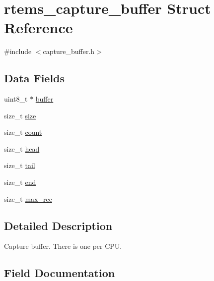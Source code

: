 \hypertarget{structrtems__capture__buffer}{}\section{rtems\+\_\+capture\+\_\+buffer Struct Reference}
\label{structrtems__capture__buffer}


{\ttfamily \#include $<$capture\+\_\+buffer.\+h$>$}

\subsection*{Data Fields}
\begin{DoxyCompactItemize}
\item 
uint8\+\_\+t $\ast$ \mbox{\hyperlink{structrtems__capture__buffer_adf23ae9c665882a5c9d80fe1e76b3e57}{buffer}}
\item 
size\+\_\+t \mbox{\hyperlink{structrtems__capture__buffer_ada65e25ece7917227c92f82d63dae799}{size}}
\item 
size\+\_\+t \mbox{\hyperlink{structrtems__capture__buffer_ab43c129e961b8385b8a7e3eabcea188a}{count}}
\item 
size\+\_\+t \mbox{\hyperlink{structrtems__capture__buffer_a2e6d2df2cc2e70caaeb8c6f1918a2a53}{head}}
\item 
size\+\_\+t \mbox{\hyperlink{structrtems__capture__buffer_a7a4c854264e8b007c79d5cc65dfc45a3}{tail}}
\item 
size\+\_\+t \mbox{\hyperlink{structrtems__capture__buffer_ae055539588b538805721709bdfb06f88}{end}}
\item 
size\+\_\+t \mbox{\hyperlink{structrtems__capture__buffer_a62b4c863e26e5e2b4395091a38fe066d}{max\+\_\+rec}}
\end{DoxyCompactItemize}


\subsection{Detailed Description}
Capture buffer. There is one per C\+PU. 

\subsection{Field Documentation}
\mbox{\label{structrtems__capture__buffer_adf23ae9c665882a5c9d80fe1e76b3e57}} 
